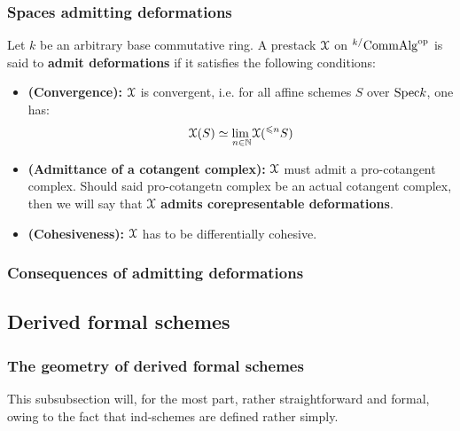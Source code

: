        \subsubsection{Spaces admitting deformations}
            \begin{definition} \label{def: prestacks_admitting_deformations}
                Let $k$ be an arbitrary base commutative ring. A prestack $\mathcal{X}$ on ${}^{k/}\mathrm{Comm}\mathrm{Alg}^{\mathrm{op}}$ is said to \textbf{admit deformations} if it satisfies the following conditions:
                    \begin{itemize}
                        \item \textbf{(Convergence):} $\mathcal{X}$ is convergent, i.e. for all affine schemes $S$ over $\mathrm{Spec} k$, one has:
                            $$\mathcal{X}(S) \simeq \underset{n \in \mathbb{N}}{\operatorname{lim} \:} \mathcal{X}({}^{\leqslant n}S)$$
                        \item \textbf{(Admittance of a cotangent complex):} $\mathcal{X}$ must admit a pro-cotangent complex. Should said pro-cotangetn complex be an actual cotangent complex, then we will say that $\mathcal{X}$ \textbf{admits corepresentable deformations}.
                        \item \textbf{(Cohesiveness):} $\mathcal{X}$ has to be differentially cohesive.
                    \end{itemize}
            \end{definition}
        
        \subsubsection{Consequences of admitting deformations}
        
    \subsection{Derived formal schemes}
        \subsubsection{The geometry of derived formal schemes}
            This subsubsection will, for the most part, rather straightforward and formal, owing to the fact that ind-schemes are defined rather simply.
            
